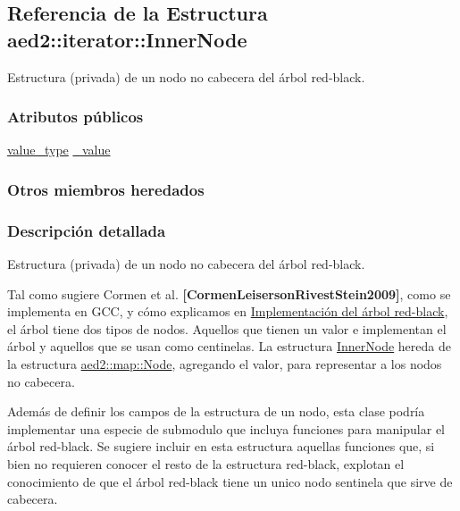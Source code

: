 \hypertarget{structaed2_1_1iterator_1_1InnerNode}{}\subsection{Referencia de la Estructura aed2\+:\+:iterator\+:\+:Inner\+Node}
\label{structaed2_1_1iterator_1_1InnerNode}


Estructura (privada) de un nodo no cabecera del árbol red-\/black.  


\subsubsection*{Atributos públicos}
\begin{DoxyCompactItemize}
\item 
\hyperlink{classaed2_1_1iterator_a6411a2c08b2b7c52f063bef1a168acb6_a6411a2c08b2b7c52f063bef1a168acb6}{value\+\_\+type} \hyperlink{structaed2_1_1iterator_1_1InnerNode_a3d80723a2dd1b746c0687f39fbc3d5e2_a3d80723a2dd1b746c0687f39fbc3d5e2}{\+\_\+value}
\end{DoxyCompactItemize}
\subsubsection*{Otros miembros heredados}


\subsubsection{Descripción detallada}
Estructura (privada) de un nodo no cabecera del árbol red-\/black. 

Tal como sugiere Cormen et al. {\bfseries [Cormen\+Leiserson\+Rivest\+Stein2009]}, como se implementa en G\+CC, y cómo explicamos en \hyperlink{Implementacion}{Implementación del árbol red-\/black}, el árbol tiene dos tipos de nodos. Aquellos que tienen un valor e implementan el árbol y aquellos que se usan como centinelas. La estructura \hyperlink{structaed2_1_1iterator_1_1InnerNode}{Inner\+Node} hereda de la estructura \hyperlink{structaed2_1_1map_1_1Node}{aed2\+::map\+::\+Node}, agregando el valor, para representar a los nodos no cabecera.

Además de definir los campos de la estructura de un nodo, esta clase podría implementar una especie de submodulo que incluya funciones para manipular el árbol red-\/black. Se sugiere incluir en esta estructura aquellas funciones que, si bien no requieren conocer el resto de la estructura red-\/black, explotan el conocimiento de que el árbol red-\/black tiene un unico nodo sentinela que sirve de cabecera.

